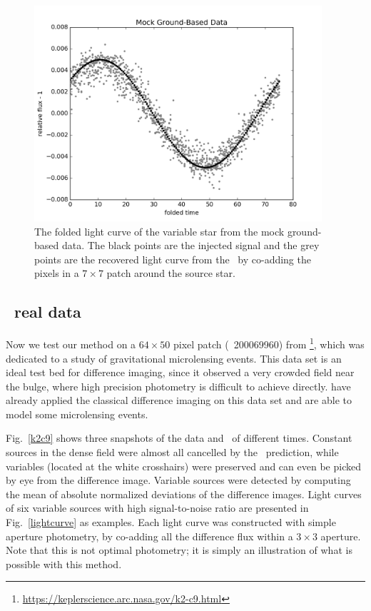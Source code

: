 \begin{figure}[p]
\begin{center}
\includegraphics[width=0.95\textwidth]{figures/cdi/f4a}
\end{center}
\caption[The light curve from \cpmdiff\ with mock ground-based data]{
\label{ground_lc}
 The folded light curve of the variable star from the mock ground-based data.
 The black points are the injected signal and the grey points are the recovered light curve from the \cpmdiff\ by co-adding the pixels in a $7\times 7$ patch around the source star.
}
\end{figure}

\subsection{\KTCN\ real data}
Now we test our method on a $64\times50$ pixel patch (\epic\ 200069960) from \KTCN\footnote{\url{https://keplerscience.arc.nasa.gov/k2-c9.html}}\citep{k2c9}, which was dedicated to a study of gravitational microlensing events.
This data set is an ideal test bed for difference imaging, since it observed a very crowded field near the bulge, where high precision photometry is difficult to achieve directly.
\cite{wei} have already applied the classical difference imaging on this data set and are able to model some microlensing events.

Fig.~\ref{k2c9} shows three snapshots of the data and \cpmdiff\ of different times.
Constant sources in the dense field were almost all cancelled by the \cpm\ prediction, while variables (located at the white crosshairs) were preserved and can even be picked by eye from the difference image.
Variable sources were detected by computing the mean of absolute normalized deviations of the difference images. 
Light curves of six variable sources with high signal-to-noise ratio are presented in Fig.~\ref{lightcurve} as examples. 
Each light curve was constructed with simple aperture photometry, by co-adding all the difference flux within a $3 \times 3$ aperture. 
Note that this is not optimal photometry; it is simply an illustration of what is possible with this method.

